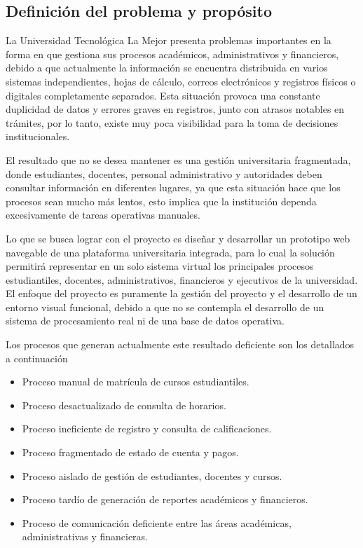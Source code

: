 \documentclass[11pt,spanish]{article}
\begin{document}
\subsection{Definición del problema y propósito}

La Universidad Tecnológica La Mejor presenta problemas importantes en la forma en que gestiona sus procesos académicos, administrativos y financieros, debido a que actualmente la información se encuentra distribuida en varios sistemas independientes, hojas de cálculo, correos electrónicos y registros físicos o digitales completamente separados. Esta situación provoca una constante duplicidad de datos y errores graves en registros, junto con atrasos notables en trámites, por lo tanto, existe muy poca visibilidad para la toma de decisiones institucionales.

El resultado que no se desea mantener es una gestión universitaria fragmentada, donde estudiantes, docentes, personal administrativo y autoridades deben consultar información en diferentes lugares, ya que esta situación hace que los procesos sean mucho más lentos, esto implica que la institución dependa excesivamente de tareas operativas manuales.

Lo que se busca lograr con el proyecto es diseñar y desarrollar un prototipo web navegable de una plataforma universitaria integrada, para lo cual la solución permitirá representar en un solo sistema virtual los principales procesos estudiantiles, docentes, administrativos, financieros y ejecutivos de la universidad. El enfoque del proyecto es puramente la gestión del proyecto y el desarrollo de un entorno visual funcional, debido a que no se contempla el desarrollo de un sistema de procesamiento real ni de una base de datos operativa.

Los procesos que generan actualmente este resultado deficiente son los detallados a continuación

\begin{itemize}
    \item Proceso manual de matrícula de cursos estudiantiles.
    \item Proceso desactualizado de consulta de horarios.
    \item Proceso ineficiente de registro y consulta de calificaciones.
    \item Proceso fragmentado de estado de cuenta y pagos.
    \item Proceso aislado de gestión de estudiantes, docentes y cursos.
    \item Proceso tardío de generación de reportes académicos y financieros.
    \item Proceso de comunicación deficiente entre las áreas académicas, administrativas y financieras.
\end{itemize}
\end{document}
